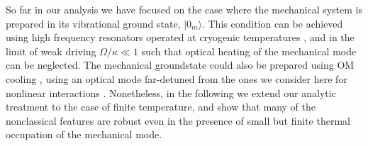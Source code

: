 So far in our analysis
we have focused on the case where the mechanical
system is prepared in its vibrational 
ground state, $|0_m\rangle$. 
This
condition can be achieved using high frequency resonators 
operated at cryogenic
temperatures \cite{O'Connell2010},
and in the limit of weak driving $\Omega/\kappa\ll1$ such
that optical
heating of the mechanical mode can be neglected. 
The mechanical groundstate  could also be 
prepared using OM cooling \cite{Metzger2004, Gigan2006, 
Arcizet2006, Kleckner2006, Corbitt2007, 
Schliesser2008,Thompson2008,Wilson2009,
O'Connell2010,Teufel2011,Chan2011},
using an optical mode far-detuned
from the ones we consider  here for 
nonlinear interactions
\cite{Stannigel2012}.
Nonetheless,
in the
following we extend our analytic treatment to the case of finite temperature, 
and show that many of the
nonclassical features are robust even
in the presence of small
but finite thermal occupation of the mechanical mode.


